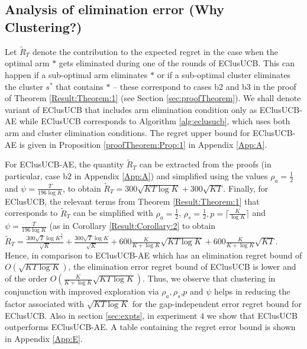 \subsection*{Analysis of elimination error (Why Clustering?)}
Let $\widetilde R_T$ denote the contribution  to the expected regret in the case when the optimal arm $*$ gets eliminated during one of the rounds of EClusUCB. This can happen if a sub-optimal arm eliminates $*$ or if a sub-optimal cluster eliminates the cluster $s^*$ that contains $*$ -- these correspond to cases b2 and b3 in the proof of Theorem \ref{Result:Theorem:1} (see Section \ref{sec:proofTheorem}). 
We shall denote variant of EClusUCB that includes arm elimination condition only as EClusUCB-AE while EClusUCB corresponds to Algorithm \ref{alg:eclusucb}, which uses both arm and cluster elimination conditions. The regret upper bound for EClusUCB-AE is given in Proposition \ref{proofTheorem:Prop:1} in Appendix \ref{App:A}.

For EClusUCB-AE, the quantity $\widetilde R_T$ can be extracted from the proofs (in particular, case b2 in Appendix \ref{App:A}) and simplified using the values $\rho_{a}=\frac{1}{2}$ and $\psi=\frac{T}{196 \log K}$, to obtain $\widetilde R_T = 300\sqrt{KT\log K}+300\sqrt{KT}$. 
Finally, for EClusUCB, the relevant terms from Theorem \ref{Result:Theorem:1} that corresponds to $\widetilde R_T$ can be simplified with $\rho_{a}=\frac{1}{2}$, $\rho_{s}=\frac{1}{2},p=\big\lceil \frac{K}{\log K} \big\rceil$ and $\psi=\frac{T}{196\log K}$ (as in Corollary \ref{Result:Corollary:2} to obtain  
$\tilde R_T = \frac{300 \sqrt{T}\log K^{\frac{3}{2}} }{\sqrt{K}} + \frac{300 \sqrt{T}\log K}{\sqrt{K}} + 600 \frac{K}{K+\log K}\sqrt{KT\log K} + 600 \frac{K}{K+\log K}\sqrt{KT}$. Hence, in comparison to EClusUCB-AE which has an elimination regret bound of $O(\sqrt{KT\log K})$, the elimination error regret bound of EClusUCB is lower and of the order $O(\frac{K}{K+\log K}\sqrt{KT\log K})$. Thus, we observe that clustering in conjunction with improved exploration via $\rho_{a},\rho_{s}$,$p$ and $\psi$ helps in reducing the factor associated with $\sqrt{KT\log K}$ for the gap-independent error regret bound for EClusUCB. Also in section \ref{sec:expts}, in experiment $4$ we show that EClusUCB outperforms EClusUCB-AE. A table containing the regret error bound is shown in Appendix \ref{App:E}.

